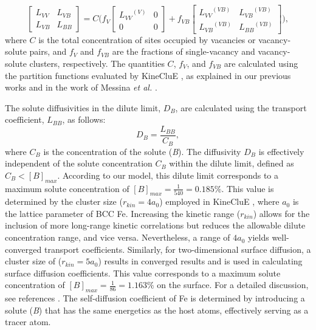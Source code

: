 \documentclass[preprint,12pt]{elsarticle}
\begin{document}
\begin{equation}
\label{eq_onsager_matrix}
\begin{bmatrix}
L_{VV} & L_{VB} \\
L_{VB} & L_{BB}
\end{bmatrix}
=
C \Biggl(
f_V 
\begin{bmatrix}
{L_{VV}}^{(V)} & 0 \\
0 & 0 
\end{bmatrix}
+ f_{VB}
\begin{bmatrix}
{L_{VV}}^{(VB)} & {L_{VB}}^{(VB)} \\
{L_{VB}}^{(VB)} & {L_{BB}}^{(VB)}
\end{bmatrix}
\Biggr),
\end{equation}
where $C$ is the total concentration of sites occupied by vacancies or vacancy-solute pairs, and $f_V$ and $f_{VB}$ are the fractions of single-vacancy and vacancy-solute clusters, respectively. The quantities $C$, $f_V$, and $f_{VB}$ are calculated using the partition functions evaluated by KineCluE \cite{schuler_kineclue_2020}, as explained in our previous works \cite{shousha2024first, shousha_vacancy-mediated_2024} and in the work of Messina \textit{et al.} \cite{messina_solute_2020}.

The solute diffusivities in the dilute limit, $D_B$, are calculated using the transport coefficient, $L_{BB}$, as follows:
\begin{equation}
\label{eq_solute_diffusivity}
    D_B = \frac{L_{BB}}{C_B},
\end{equation}
where $C_B$ is the concentration of the solute (\textit{B}).  The diffusivity \( D_B \) is effectively independent of the solute concentration \( C_B \) within the dilute limit, defined as $C_B < [B]_{max}$. According to our model, this dilute limit corresponds to a maximum solute concentration of $[B]_{max} = \frac{1}{540} = 0.185\%$. This value is determined by the cluster size ($r_{kin} = 4 a_0$) employed in KineCluE \cite{schuler_kineclue_2020}, where \( a_0 \) is the lattice parameter of BCC Fe. Increasing the kinetic range ($r_{kin}$) allows for the inclusion of more long-range kinetic correlations but reduces the allowable dilute concentration range, and vice versa. Nevertheless, a range of \( 4a_0 \) yields well-converged transport coefficients. Similarly, for two-dimensional surface diffusion, a cluster size of ($r_{kin} = 5 a_0$) results in converged results and is used in calculating surface diffusion coefficients. This value corresponds to a maximum solute concentration of $[B]_{max} = \frac{1}{86} = 1.163\%$ on the surface. For a detailed discussion, see references \cite{shousha2024first, shousha_vacancy-mediated_2024, messina_solute_2020}.
The self-diffusion coefficient of Fe is determined by introducing a solute (\textit{B}) that has the same energetics as the host atoms, effectively serving as a tracer atom.
\end{document}
